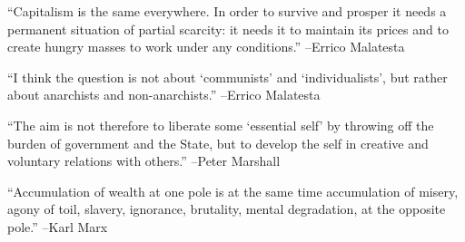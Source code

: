 \documentclass{article}%
\begin{document}
\linebreak%
\vspace{1mm}%
\begin{minipage}{\textwidth}%
\flushleft%
“Capitalism is the same everywhere. In order to survive and prosper it needs a permanent situation of partial scarcity: it needs it to maintain its prices and to create hungry masses to work under any conditions.”%
\linebreak%
\vspace{1mm}%
–Errico Malatesta%
\linebreak%
\vspace{1mm}%
\end{minipage}%
\linebreak%
\vspace{1mm}%
\begin{minipage}{\textwidth}%
\flushleft%
“I think the question is not about ‘communists’ and ‘individualists’, but rather about anarchists and non{-}anarchists.”%
\linebreak%
\vspace{1mm}%
–Errico Malatesta%
\linebreak%
\vspace{1mm}%
\end{minipage}%
\linebreak%
\vspace{1mm}%
\begin{minipage}{\textwidth}%
\flushleft%
“The aim is not therefore to liberate some ‘essential self’ by throwing off the burden of government and the State, but to develop the self in creative and voluntary relations with others.”%
\linebreak%
\vspace{1mm}%
–Peter Marshall%
\linebreak%
\vspace{1mm}%
\end{minipage}%
\linebreak%
\vspace{1mm}%
\begin{minipage}{\textwidth}%
\flushleft%
“Accumulation of wealth at one pole is at the same time accumulation of misery, agony of toil, slavery, ignorance, brutality, mental degradation, at the opposite pole.”%
\linebreak%
\vspace{1mm}%
–Karl Marx%
\linebreak%
\vspace{1mm}%
\end{minipage}%
\linebreak%
\end{document}
